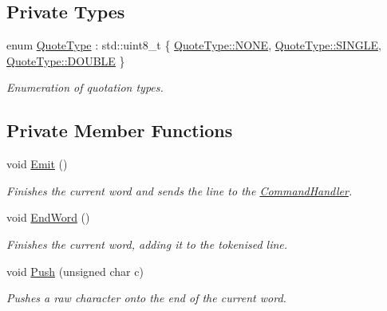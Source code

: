 \subsection*{Private Types}
\begin{DoxyCompactItemize}
\item 
enum \hyperlink{classTokeniser_a71d622e60fae9d6c36c96ba69a4f62e4}{Quote\+Type} \+: std\+::uint8\+\_\+t \{ \hyperlink{classTokeniser_a71d622e60fae9d6c36c96ba69a4f62e4ab50339a10e1de285ac99d4c3990b8693}{Quote\+Type\+::\+N\+O\+N\+E}, 
\hyperlink{classTokeniser_a71d622e60fae9d6c36c96ba69a4f62e4a0679273e201afd0bf57af3961f8a23b8}{Quote\+Type\+::\+S\+I\+N\+G\+L\+E}, 
\hyperlink{classTokeniser_a71d622e60fae9d6c36c96ba69a4f62e4afd3e4ece78a7d422280d5ed379482229}{Quote\+Type\+::\+D\+O\+U\+B\+L\+E}
 \}
\begin{DoxyCompactList}\small\item\em Enumeration of quotation types. \end{DoxyCompactList}\end{DoxyCompactItemize}
\subsection*{Private Member Functions}
\begin{DoxyCompactItemize}
\item 
\hypertarget{classTokeniser_a71405521b0e9c00a0d9b1a2f32ae10c2}{void \hyperlink{classTokeniser_a71405521b0e9c00a0d9b1a2f32ae10c2}{Emit} ()}\label{classTokeniser_a71405521b0e9c00a0d9b1a2f32ae10c2}

\begin{DoxyCompactList}\small\item\em Finishes the current word and sends the line to the \hyperlink{classCommandHandler}{Command\+Handler}. \end{DoxyCompactList}\item 
\hypertarget{classTokeniser_abb18309e5b6cce8fc63cdb4b02e69bf3}{void \hyperlink{classTokeniser_abb18309e5b6cce8fc63cdb4b02e69bf3}{End\+Word} ()}\label{classTokeniser_abb18309e5b6cce8fc63cdb4b02e69bf3}

\begin{DoxyCompactList}\small\item\em Finishes the current word, adding it to the tokenised line. \end{DoxyCompactList}\item 
void \hyperlink{classTokeniser_a0c62f5dd06a42d478a93595fc78b76fa}{Push} (unsigned char c)
\begin{DoxyCompactList}\small\item\em Pushes a raw character onto the end of the current word. \end{DoxyCompactList}\end{DoxyCompactItemize}
